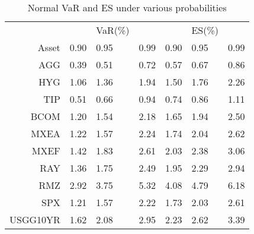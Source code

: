 \begin{table}[!h]
\caption{Normal VaR and ES under various probabilities} %
\centering 
\begin{tabular}{ | r || p{1cm} p{1cm} p{1cm} || p{1cm} p{1cm} p{1cm} | } 
 \hline
 & & VaR(\%) &&& ES(\%) & \\
Asset& 0.90 & 0.95 & 0.99 & 0.90 & 0.95 & 0.99 \\
  \hline \hline
AGG & 0.39 & 0.51 & 0.72 & 0.57 & 0.67 & 0.86\\ 
HYG & 1.06 & 1.36 & 1.94 & 1.50 & 1.76 & 2.26\\ 
TIP & 0.51 & 0.66 & 0.94 & 0.74 & 0.86 & 1.11\\ 
BCOM & 1.20 & 1.54 & 2.18 & 1.65 & 1.94 & 2.50\\ 
MXEA & 1.22 & 1.57 & 2.24 & 1.74 & 2.04 & 2.62\\ 
MXEF & 1.42 & 1.83 & 2.61 & 2.03 & 2.38 & 3.06\\ 
RAY & 1.36 & 1.75 & 2.49 & 1.95 & 2.29 & 2.94\\ 
RMZ & 2.92 & 3.75 & 5.32 & 4.08 & 4.79 & 6.18\\ 
SPX & 1.21 & 1.57 & 2.22 & 1.73 & 2.03 & 2.61\\ 
USGG10YR & 1.62 & 2.08 & 2.95 & 2.23 & 2.62 & 3.39\\
 \hline
\end{tabular}
\label{table:VaRESNormal}
\end{table}
